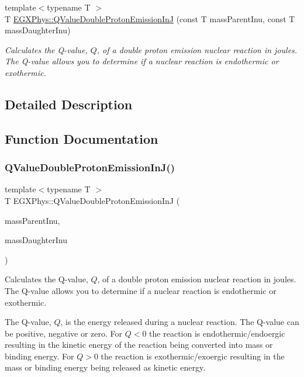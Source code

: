 \begin{DoxyCompactItemize}
{\footnotesize template$<$typename T $>$ }\\T \mbox{\hyperlink{group___e_g_x_phys-_q_value-_proton_gab8979dd25aeac115834a4a8b233fec6f}{E\+G\+X\+Phys\+::\+Q\+Value\+Double\+Proton\+Emission\+InJ}} (const T mass\+Parent\+Inu, const T mass\+Daughter\+Inu)
\begin{DoxyCompactList}\small\item\em Calculates the Q-\/value, $Q$, of a double proton emission nuclear reaction in joules. The Q-\/value allows you to determine if a nuclear reaction is endothermic or exothermic. \end{DoxyCompactList}\end{DoxyCompactItemize}


\subsection{Detailed Description}


\subsection{Function Documentation}
\mbox{\label{group___e_g_x_phys-_q_value-_proton_gab8979dd25aeac115834a4a8b233fec6f}} 
\subsubsection{\texorpdfstring{Q\+Value\+Double\+Proton\+Emission\+In\+J()}{QValueDoubleProtonEmissionInJ()}}
{\footnotesize\ttfamily template$<$typename T $>$ \\
T E\+G\+X\+Phys\+::\+Q\+Value\+Double\+Proton\+Emission\+InJ (\begin{DoxyParamCaption}\item[{const T}]{mass\+Parent\+Inu,  }\item[{const T}]{mass\+Daughter\+Inu }\end{DoxyParamCaption})}



Calculates the Q-\/value, $Q$, of a double proton emission nuclear reaction in joules. The Q-\/value allows you to determine if a nuclear reaction is endothermic or exothermic. 

The Q-\/value, $Q$, is the energy released during a nuclear reaction. The Q-\/value can be positive, negative or zero. For $Q < 0$ the reaction is endothermic/endoergic resulting in the kinetic energy of the reaction being converted into mass or binding energy. For $Q > 0$ the reaction is exothermic/exoergic resulting in the mass or binding energy being released as kinetic energy.

